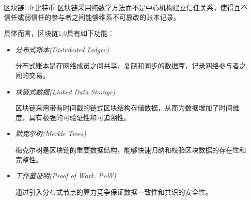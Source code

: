 \documentclass[11pt]{beamer}
\begin{document}
\begin{frame}[allowframebreaks]{区块链1.0:比特币}
	区块链采用纯数学方法而不是中心机构建立信任关系，使得互不信任或弱信任的参与者之间能够维系不可篡改的账本记录。

	具体而言，区块链1.0具有如下功能：
	\begin{itemize}
		\item \textsl{分布式账本(Distributed Ledger)}

		      {\footnotesize 分布式账本是在网络成员之间共享、复制和同步的数据库，记录网络参与者之间的交易。}

		\item \textsl{块链式数据(Linked Data Storage)}

		      {\footnotesize 区块链采用带有时间戳的链式区块结构存储数据，从而为数据增加了时间维度，具有极强的可验证性和可追溯性。}

		\item \textsl{默克尔树(Merkle Trees)}

		      {\footnotesize 梅克尔树是区块链的重要数据结构，能够快速归纳和校验区块数据的存在性和完整性。}

		\item \textsl{工作量证明(Proof of Work, PoW)}

		      {\footnotesize 通过引入分布式节点的算力竞争保证数据一致性和共识的安全性。}
	\end{itemize}
\end{frame}
\end{document}
